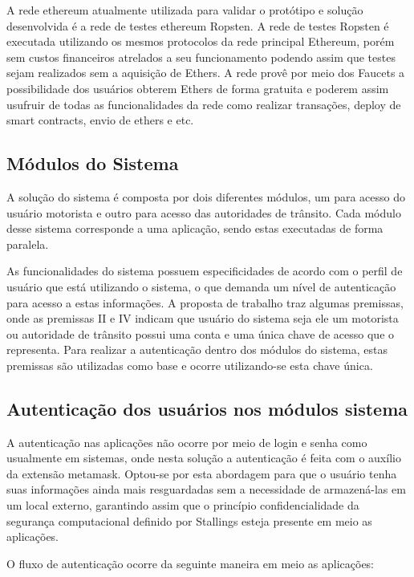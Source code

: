 A rede ethereum atualmente utilizada para validar o protótipo e solução desenvolvida é a rede de testes ethereum Ropsten. A rede de testes Ropsten é executada utilizando os mesmos protocolos da rede principal Ethereum, porém sem custos financeiros atrelados a seu funcionamento podendo assim que testes sejam realizados sem a aquisição de Ethers. A rede provê por meio dos Faucets  a possibilidade dos usuários obterem Ethers de forma gratuita e poderem assim usufruir de todas as funcionalidades da rede como realizar transações, deploy de smart contracts, envio de ethers e etc.

\subsection{Módulos do Sistema}

A solução do sistema é composta por dois diferentes módulos, um para acesso do usuário motorista e outro para acesso das autoridades de trânsito. Cada módulo desse sistema corresponde a uma aplicação, sendo estas executadas de forma paralela.

As funcionalidades do sistema possuem especificidades de acordo com o perfil de usuário que está utilizando o sistema, o que demanda um nível de autenticação para acesso a estas informações. A proposta de trabalho traz algumas premissas, onde as premissas II e IV indicam que  usuário do sistema seja ele um motorista ou autoridade de trânsito possui uma conta e uma única chave de acesso que o representa. Para realizar a autenticação dentro dos módulos do sistema, estas premissas são utilizadas como base e ocorre utilizando-se esta chave única.

\subsection{Autenticação dos usuários nos módulos sistema}

A autenticação nas aplicações não ocorre por meio de login e senha como usualmente em sistemas, onde nesta solução a autenticação é feita com o auxílio da extensão metamask. Optou-se por esta abordagem para que o usuário tenha suas informações ainda mais resguardadas sem a necessidade de armazená-las em um local externo, garantindo assim que o princípio confidencialidade da segurança computacional definido por Stallings esteja presente em meio as aplicações.

O fluxo de autenticação ocorre da seguinte maneira em meio as aplicações:


